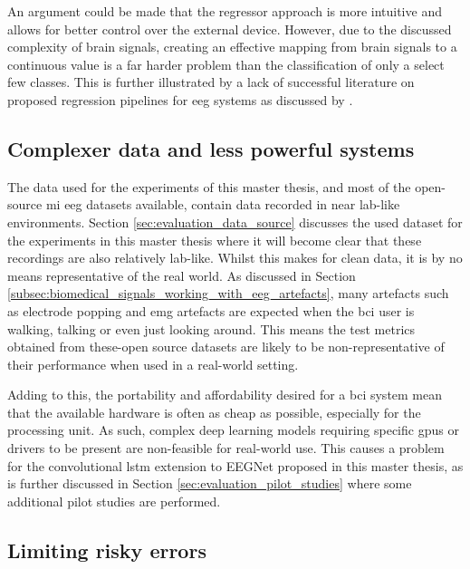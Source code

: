 An argument could be made that the regressor approach is more intuitive and allows for better control over the external device.
However, due to the discussed complexity of brain signals, creating an effective mapping from brain signals to a continuous value is a far harder problem than the classification of only a select few classes.
This is further illustrated by a lack of successful literature on proposed regression pipelines for \gls{eeg} systems as discussed by \citet{bci_review_arnau}.


\subsection{Complexer data and less powerful systems}
\label{subsec:online_bci_system_different_goal_speed} 

The data used for the experiments of this master thesis, and most of the open-source \gls{mi} \gls{eeg} datasets available, contain data recorded in near lab-like environments.
Section \ref{sec:evaluation_data_source} discusses the used dataset for the experiments in this master thesis where it will become clear that these recordings are also relatively lab-like.
Whilst this makes for clean data, it is by no means representative of the real world.
As discussed in Section \ref{subsec:biomedical_signals_working_with_eeg_artefacts}, many artefacts such as electrode popping and \gls{emg} artefacts are expected when the \gls{bci} user is walking, talking or even just looking around.
This means the test metrics obtained from these-open source datasets are likely to be non-representative of their performance when used in a real-world setting.

Adding to this, the portability and affordability desired for a \gls{bci} system mean that the available hardware is often as cheap as possible, especially for the processing unit.
As such, complex deep learning models requiring specific \glspl{gpu} or drivers to be present are non-feasible for real-world use.
This causes a problem for the convolutional \gls{lstm} extension to EEGNet proposed in this master thesis, as is further discussed in Section \ref{sec:evaluation_pilot_studies} where some additional pilot studies are performed.


\subsection{Limiting risky errors}
\label{subsec:online_bci_system_different_goal_limit_risk} 

